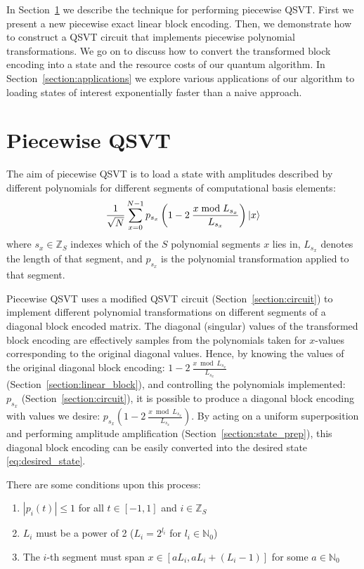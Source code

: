 \documentclass[a4paper,twocolumn,,accepted=2025-05-27]{quantumarticle}
\theoremstyle{empty}
\begin{document}
In Section~\ref{section:piecewise_qsvt} we describe the technique for performing piecewise QSVT. First we present a new piecewise exact linear block encoding. Then, we demonstrate how to construct a QSVT circuit that implements piecewise polynomial transformations. We go on to discuss how to convert the transformed block encoding into a state and the resource costs of our quantum algorithm. In Section~\ref{section:applications} we explore various applications of our algorithm to loading states of interest exponentially faster than a naive approach. 


\section{Piecewise QSVT}
\label{section:piecewise_qsvt}
The aim of piecewise QSVT is to load a state with amplitudes described by different polynomials for different segments of computational basis elements:
\begin{equation}
    \frac{1}{\sqrt{N}}\sum_{x=0}^{N-1} p_{s_x}\left( 1 - 2\>\frac{x \bmod L_{s_x}}{L_{s_x}}\right)  \ket{x}
    \label{eq:desired_state}
\end{equation}
where $s_x \in \mathbb{Z}_S$ indexes which of the $S$ polynomial segments $x$ lies in, $L_{s_x}$ denotes the length of that segment, and $p_{s_x}$ is the polynomial transformation applied to that segment.

Piecewise QSVT uses a modified QSVT circuit (Section~\ref{section:circuit}) to implement different polynomial transformations on different segments of a diagonal block encoded matrix. The diagonal (singular) values of the transformed block encoding are effectively samples from the polynomials taken for $x$-values corresponding to the original diagonal values. Hence, by knowing the values of the original diagonal block encoding: $1 - 2\>\frac{x \bmod L_{s_x}}{L_{s_x}}$ (Section~\ref{section:linear_block}), and controlling the polynomials implemented: $p_{s_x}$ (Section~\ref{section:circuit}), it is possible to produce a diagonal block encoding with values we desire: $p_{s_x}\left( 1 - 2\>\frac{x \bmod L_{s_x}}{L_{s_x}}\right) $. By acting on a uniform superposition and performing amplitude amplification (Section~\ref{section:state_prep}), this diagonal block encoding can be easily converted into the desired state \eqref{eq:desired_state}.


There are some conditions upon this process:
\begin{enumerate}[{(1)}]
    \item $|p_i(t)| \leq 1$ for all $t \in [-1,1]$ and $i \in \mathbb{Z}_S$
    \item $L_i$ must be a power of 2 ($L_i = 2^{l_i}$ for $l_i \in \mathbb{N}_0$)
    \item The $i$-th segment must span $x \in [aL_i, aL_i + (L_i - 1)]$ for some $a \in \mathbb{N}_0$
\end{enumerate}
\end{document}
